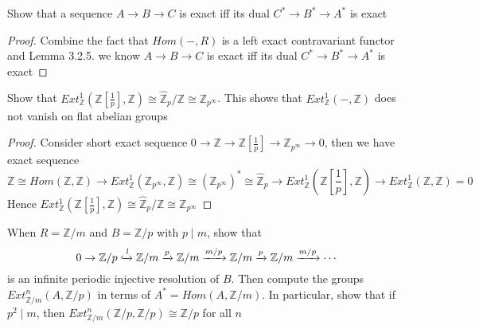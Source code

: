 \documentclass{article}
\newenvironment{exercise}[2][Exercise]{\begin{trivlist}
\item[\hskip \labelsep {\bfseries #1}\hskip \labelsep {\bfseries #2.}]}{\end{trivlist}}
\theoremstyle{definition}
\theoremstyle{remark}
\theoremstyle{definition}
\begin{document}
\begin{exercise}{\textbf{3.2.4}}
Show that a sequence $A\to B\to C$ is exact iff its dual $C^*\to B^*\to A^*$ is exact
\end{exercise}

\begin{proof}
Combine the fact that $Hom(-,R)$ is a left exact contravariant functor and Lemma 3.2.5. we know $A\to B\to C$ is exact iff its dual $C^*\to B^*\to A^*$ is exact
\end{proof}

\begin{exercise}{\textbf{3.3.1}}
Show that $Ext^1_\mathbb{Z}\left(\mathbb Z\left[\frac{1}{p}\right],\mathbb Z\right)\cong\widehat{\mathbb Z}_p/\mathbb Z\cong\mathbb Z_{p^\infty}$. This shows that $Ext^1_{\mathbb Z}(-,\mathbb Z)$ does not vanish on flat abelian groups
\end{exercise}

\begin{proof}
Consider short exact sequence $0\to\mathbb Z\to\mathbb Z\left[\frac{1}{p}\right]\to\mathbb Z_{p^\infty}\to0$, then we have exact sequence
\[\mathbb Z\cong Hom(\mathbb Z,\mathbb Z)\to Ext_\mathbb{Z}^1(\mathbb Z_{p^\infty},\mathbb Z)\cong(\mathbb Z_{p^\infty})^*\cong\widehat{\mathbb Z}_p\to Ext_{\mathbb Z}^1\left(\textstyle\mathbb Z\left[\frac{1}{p}\right],\mathbb Z\right)\to Ext_{\mathbb Z}^1(\mathbb Z,\mathbb Z)=0\]
Hence $Ext^1_\mathbb{Z}\left(\mathbb Z\left[\frac{1}{p}\right],\mathbb Z\right)\cong\widehat{\mathbb Z}_p/\mathbb Z\cong\mathbb Z_{p^\infty}$
\end{proof}

\begin{exercise}{\textbf{3.3.2}}
When $R=\mathbb Z/m$ and $B=\mathbb Z/p$ with $p\mid m$, show that
\[0\to\mathbb Z/p\xhookrightarrow{l}\mathbb Z/m\xrightarrow{p}\mathbb Z/m\xrightarrow{m/p}\mathbb Z/m\xrightarrow{p}\mathbb Z/m\xrightarrow{m/p}\cdots\]
is an infinite periodic injective resolution of $B$. Then compute the groups $Ext^n_{\mathbb Z/m}(A,\mathbb Z/p)$ in terms of $A^*=Hom(A,\mathbb Z/m)$. In particular, show that if $p^2\mid m$, then $Ext^n_{\mathbb Z/m}(\mathbb Z/p,\mathbb Z/p)\cong\mathbb Z/p$ for all $n$
\end{exercise}
\end{document}
